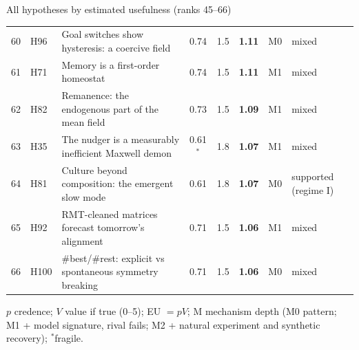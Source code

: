 \begin{frame}{All hypotheses by estimated usefulness (ranks 45--66)}
{\begin{tabular}{@{}rl>{\raggedright\arraybackslash}p{}ccccl@{}}
60 & H96 & Goal switches show hysteresis: a coercive field & 0.74 & 1.5 & \textbf{1.11} & M0 & mixed\\
61 & H71 & Memory is a first-order homeostat & 0.74 & 1.5 & \textbf{1.11} & M1 & mixed\\
62 & H82 & Remanence: the endogenous part of the mean field & 0.73 & 1.5 & \textbf{1.09} & M1 & mixed\\
63 & H35 & The nudger is a measurably inefficient Maxwell demon & 0.61$^\ast$ & 1.8 & \textbf{1.07} & M1 & mixed\\
64 & H81 & Culture beyond composition: the emergent slow mode & 0.61 & 1.8 & \textbf{1.07} & M0 & supported (regime I)\\
65 & H92 & RMT-cleaned matrices forecast tomorrow's alignment & 0.71 & 1.5 & \textbf{1.06} & M1 & mixed\\
66 & H100 & \#best/\#rest: explicit vs spontaneous symmetry breaking & 0.71 & 1.5 & \textbf{1.06} & M0 & mixed\\
\end{tabular}}\par\vspace{0.2em}
{\tiny\color{muted}$p$ credence; $V$ value if true (0--5); EU $=pV$; M mechanism depth (M0 pattern; M1 + model signature, rival fails; M2 + natural experiment and synthetic recovery); $^\ast$fragile.}
\end{frame}

